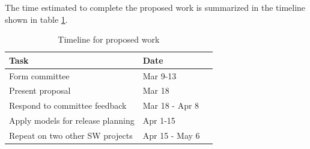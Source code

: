 \documentclass[a4paper]{scrartcl}
\begin{document}
The time estimated to complete the proposed work is summarized in the timeline shown in table \ref{tab:timeline}.

\begin{table}[h]
\centering
\begin{tabular}{ p{2.5in} l l}
\hline
Task & Date \\
\hline
Form committee & Mar 9-13 \\
Present proposal & Mar 18 \\
Respond to committee feedback & Mar 18 - Apr 8 \\
Apply models for release planning & Apr 1-15 \\
Repeat on two other SW projects & Apr 15 - May 6 \\
\hline
\end{tabular}
\caption{Timeline for proposed work}
\label{tab:timeline}
\end{table}





\end{document}
